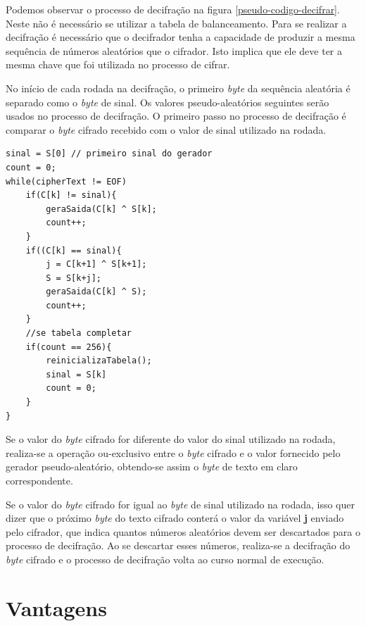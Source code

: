 Podemos observar o processo de decifração na figura \ref{pseudo-codigo-decifrar}. Neste não é necessário se utilizar a tabela de balanceamento. Para se realizar a decifração é necessário que o decifrador tenha a capacidade de produzir a mesma sequência de números aleatórios que o cifrador. Isto implica que ele deve ter a mesma chave que foi utilizada no processo de cifrar.

No início de cada rodada na decifração, o primeiro \textit{byte} da sequência aleatória é separado como o \textit{byte} de sinal. Os valores pseudo-aleatórios seguintes serão usados no processo de decifração. O primeiro passo no processo de decifração é comparar o \textit{byte} cifrado recebido com o valor de sinal utilizado na rodada. 



    \begin{lstlisting}[caption={Pseudo-Código Decifração}, label=pseudo-codigo-decifrar]
sinal = S[0] // primeiro sinal do gerador
count = 0;
while(cipherText != EOF)
	if(C[k] != sinal){
		geraSaida(C[k] ^ S[k];
		count++;
	}
	if((C[k] == sinal){
		j = C[k+1] ^ S[k+1];
		S = S[k+j];
		geraSaida(C[k] ^ S);
		count++;
	}
	//se tabela completar
	if(count == 256){
		reinicializaTabela();
		sinal = S[k]
		count = 0;
	}
}
    \end{lstlisting}

Se o valor do \textit{byte} cifrado for diferente do valor do sinal utilizado na rodada, realiza-se a operação ou-exclusivo entre o \textit{byte} cifrado e o valor fornecido pelo gerador pseudo-aleatório, obtendo-se assim o \textit{byte} de texto em claro correspondente.

Se o valor do \textit{byte} cifrado for igual ao \textit{byte} de sinal utilizado na rodada, isso quer dizer que o próximo \textit{byte} do texto cifrado conterá o valor da variável \textbf{j} enviado pelo cifrador, que indica quantos números aleatórios devem ser descartados para o processo de decifração. Ao se descartar esses números, realiza-se a decifração do \textit{byte} cifrado e o processo de decifração volta ao curso normal de execução.

\section{Vantagens}

